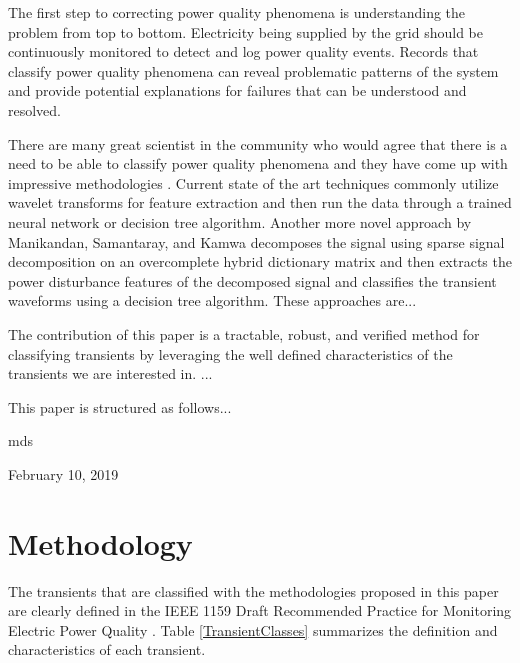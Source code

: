 \documentclass[10pt,conference,compsocconf]{IEEEtran}
\begin{document}
The first step to correcting power quality phenomena is understanding the problem from top to bottom. Electricity being supplied by the grid should be continuously monitored to detect and log power quality events. Records that classify power quality phenomena can reveal problematic patterns of the system and provide potential explanations for failures that can be understood and resolved. 

There are many great scientist in the community who would agree that there is a need to be able to classify power quality phenomena and they have come up with impressive methodologies \cite{Garrido:2014:PhenomenaClassification} \cite{Manikandan:2014:PQClassificationUsingSSD} \cite{Thirumala:2016:PQClassificationUsingWavelet} \cite{Rodriguez:2014:PQClassificationUsingANN} \cite{Tse:2012:PQClassificationUsingHHT}. Current state of the art techniques commonly utilize wavelet transforms for feature extraction and then run the data through a trained neural network or decision tree algorithm.  Another more novel approach by Manikandan, Samantaray, and Kamwa \cite{Manikandan:2014:PQClassificationUsingSSD} decomposes the signal using sparse signal decomposition on an overcomplete hybrid dictionary matrix and then extracts the power disturbance features of the decomposed signal and classifies the transient waveforms using a decision tree algorithm. These approaches are...

The contribution of this paper is a tractable, robust, and verified method for classifying transients by leveraging the well defined characteristics of the transients we are interested in. ...

This paper is structured as follows...


\hfill mds
 
\hfill February 10, 2019

\section{Methodology}
The transients that are classified with the methodologies proposed in this paper are clearly defined in the IEEE 1159 Draft Recommended Practice for Monitoring Electric Power Quality \cite{IEEE:2018:1159D3}. Table \ref{TransientClasses} summarizes the definition and characteristics of each transient.
\end{document}
